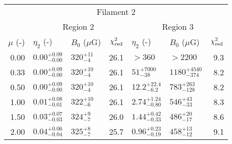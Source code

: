 \begin{tabular}{@{}rllrllr@{}}
\midrule
\multicolumn{7}{c}{Filament 2} \\
\cmidrule{1-7}
{} & \multicolumn{3}{c}{Region 2\tablenotemark{a}}
   & \multicolumn{3}{c}{Region 3} \\
\cmidrule(lr){2-4} \cmidrule(l){5-7}
$\mu$ (-) & $\eta_2$ (-) & $B_0$ ($\mu$G) & $\chi^2_{\mathrm{red}}$
          & $\eta_2$ (-) & $B_0$ ($\mu$G) & $\chi^2_{\mathrm{red}}$ \\
\cmidrule{1-7}
0.00 & ${0.00}^{+0.09}_{-0.00}$ & ${320}^{+11}_{-4}$ & 26.1
     & $>360$ & $>2200$ & 9.3 \\
0.33 & ${0.00}^{+0.09}_{-0.00}$ & ${320}^{+10}_{-4}$ & 26.1
     & ${51}^{+7000}_{-38}$ & ${1180}^{+4540}_{-374}$ & 8.2 \\
0.50 & ${0.00}^{+0.09}_{-0.00}$ & ${320}^{+10}_{-4}$ & 26.1
     & ${12.2}^{+22.4}_{-6.2}$ & ${783}^{+263}_{-128}$ & 8.2 \\
1.00 & ${0.01}^{+0.08}_{-0.01}$ & ${322}^{+10}_{-6}$ & 26.1
     & ${2.74}^{+1.24}_{-0.80}$ & ${546}^{+43}_{-33}$ & 8.3 \\
1.50 & ${0.03}^{+0.07}_{-0.03}$ & ${324}^{+9}_{-7}$ & 26.0
     & ${1.44}^{+0.42}_{-0.33}$ & ${486}^{+20}_{-17}$ & 8.6 \\
2.00 & ${0.04}^{+0.06}_{-0.04}$ & ${325}^{+8}_{-7}$ & 25.7
     & ${0.96}^{+0.23}_{-0.19}$ & ${458}^{+13}_{-12}$ & 9.1 \\
\bottomrule
\end{tabular}
